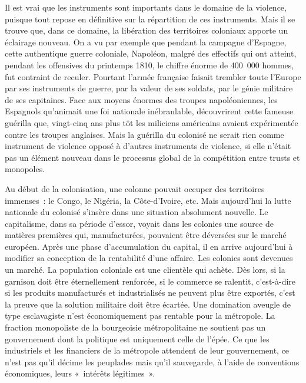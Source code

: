 \documentclass[french,twoside]{book} %
\begin{document}
\bigbreak
\noindent Il est vrai que les instruments sont importants dans le domaine de la violence, puisque tout repose en définitive sur la répartition de ces instruments. Mais il se trouve que, dans ce domaine, la libération des territoires coloniaux apporte un éclairage nouveau. On a vu par exemple que pendant la campagne d’Espagne, cette authentique guerre coloniale, Napoléon, malgré des effectifs qui ont atteint, pendant les offensives du printemps 1810, le chiffre énorme de 400 000 hommes, fut contraint de reculer. Pourtant l’armée française faisait trembler toute l’Europe par ses instruments de guerre, par la valeur de ses soldats, par le génie militaire de ses capitaines. Face aux moyens énormes des troupes napoléoniennes, les Espagnols qu’animait une foi nationale inébranlable, découvrirent cette fameuse guérilla que, vingt-cinq ans plus tôt les miliciens américains avaient expérimentée contre les troupes anglaises. Mais la guérilla du colonisé ne serait rien comme instrument de violence opposé à d’autres instruments de violence, si elle n’était pas un élément nouveau dans le processus global de la compétition entre trusts et monopoles.\par
\bigbreak
\noindent Au début de la colonisation, une colonne pouvait occuper des territoires immenses : le Congo, le Nigéria, la Côte-d’Ivoire, etc. Mais aujourd’hui la lutte nationale du colonisé s’insère dans une situation absolument nouvelle. Le capitalisme, dans sa période d’essor, voyait dans les colonies une source de matières   premières qui, manufacturées, pouvaient être déversées sur le marché européen. Après une phase d’accumulation du capital, il en arrive aujourd’hui à modifier sa conception de la rentabilité d’une affaire. Les colonies sont devenues un marché. La population coloniale est une clientèle qui achète. Dès lors, si la garnison doit être éternellement renforcée, si le commerce se ralentit, c’est-à-dire si les produits manufacturés et industrialisés ne peuvent plus être exportés, c’est la preuve que la solution militaire doit être écartée. Une domination aveugle de type esclavagiste n’est économiquement pas rentable pour la métropole. La fraction monopoliste de la bourgeoisie métropolitaine ne soutient pas un gouvernement dont la politique est uniquement celle de l’épée. Ce que les industriels et les financiers de la métropole attendent de leur gouvernement, ce n’est pas qu’il décime les peuplades mais qu’il sauvegarde, à l’aide de conventions économiques, leurs « intérêts légitimes ».\par
\end{document}
